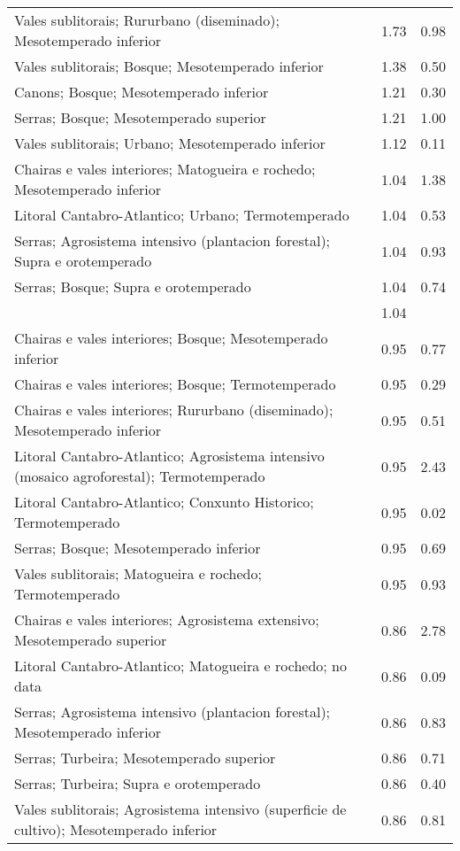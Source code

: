 \begin{table}[p]
\begin{tabular}{lrr}
  Vales sublitorais; Rururbano (diseminado); Mesotemperado inferior & 1.73 & 0.98 \\ 
  Vales sublitorais; Bosque; Mesotemperado inferior & 1.38 & 0.50 \\ 
  Canons; Bosque; Mesotemperado inferior & 1.21 & 0.30 \\ 
  Serras; Bosque; Mesotemperado superior & 1.21 & 1.00 \\ 
  Vales sublitorais; Urbano; Mesotemperado inferior & 1.12 & 0.11 \\ 
  Chairas e vales interiores; Matogueira e rochedo; Mesotemperado inferior & 1.04 & 1.38 \\ 
  Litoral Cantabro-Atlantico; Urbano; Termotemperado & 1.04 & 0.53 \\ 
  Serras; Agrosistema intensivo (plantacion forestal); Supra e orotemperado & 1.04 & 0.93 \\ 
  Serras; Bosque; Supra e orotemperado & 1.04 & 0.74 \\ 
   & 1.04 &  \\ 
  Chairas e vales interiores; Bosque; Mesotemperado inferior & 0.95 & 0.77 \\ 
  Chairas e vales interiores; Bosque; Termotemperado & 0.95 & 0.29 \\ 
  Chairas e vales interiores; Rururbano (diseminado); Mesotemperado inferior & 0.95 & 0.51 \\ 
  Litoral Cantabro-Atlantico; Agrosistema intensivo (mosaico agroforestal); Termotemperado & 0.95 & 2.43 \\ 
  Litoral Cantabro-Atlantico; Conxunto Historico; Termotemperado & 0.95 & 0.02 \\ 
  Serras; Bosque; Mesotemperado inferior & 0.95 & 0.69 \\ 
  Vales sublitorais; Matogueira e rochedo; Termotemperado & 0.95 & 0.93 \\ 
  Chairas e vales interiores; Agrosistema extensivo; Mesotemperado superior & 0.86 & 2.78 \\ 
  Litoral Cantabro-Atlantico; Matogueira e rochedo; no data & 0.86 & 0.09 \\ 
  Serras; Agrosistema intensivo (plantacion forestal); Mesotemperado inferior & 0.86 & 0.83 \\ 
  Serras; Turbeira; Mesotemperado superior & 0.86 & 0.71 \\ 
  Serras; Turbeira; Supra e orotemperado & 0.86 & 0.40 \\ 
  Vales sublitorais; Agrosistema intensivo (superficie de cultivo); Mesotemperado inferior & 0.86 & 0.81 \\ 

\end{tabular}
\end{table}
